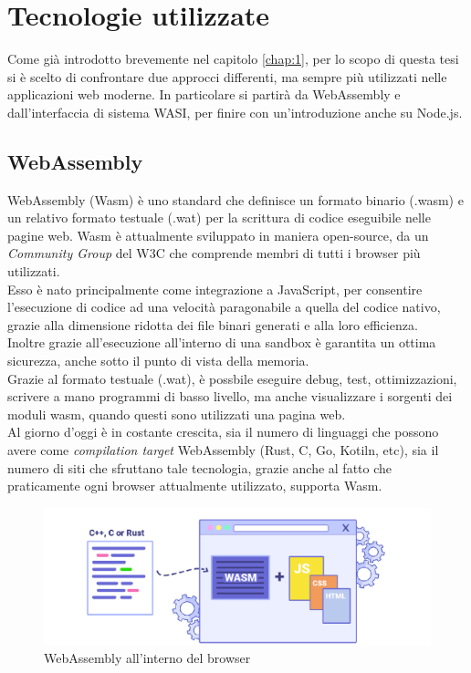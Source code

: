 \chapter{Tecnologie utilizzate}
\label{chap:2}
Come già introdotto brevemente nel capitolo \ref{chap:1}, per lo scopo di questa tesi si è scelto di confrontare due approcci differenti, ma sempre più utilizzati nelle applicazioni web moderne.
In particolare si partirà da WebAssembly e dall'interfaccia di sistema WASI, per finire con un'introduzione anche su Node.js.

\section{WebAssembly}
\label{sec:Wasm}
WebAssembly (Wasm) è uno standard che definisce un formato binario (.wasm) e un relativo formato testuale (.wat) per la scrittura di codice eseguibile nelle pagine web. 
Wasm è attualmente sviluppato in maniera open-source, da un \emph{Community Group} del W3C che comprende membri di tutti i browser più utilizzati.
\\Esso è nato principalmente come integrazione a JavaScript, per consentire l'esecuzione di codice ad una velocità paragonabile a quella del codice nativo, grazie alla dimensione ridotta dei file binari generati e alla loro efficienza.
\\Inoltre grazie all'esecuzione all'interno di una sandbox è garantita un ottima sicurezza, anche sotto il punto di vista della memoria.
\\Grazie al formato testuale (.wat), è possbile eseguire debug, test, ottimizzazioni, scrivere a mano programmi di basso livello, ma anche visualizzare i sorgenti dei moduli wasm, quando questi sono utilizzati una pagina web.
\cite*{wasmDesign}
\\Al giorno d'oggi è in costante crescita, sia il numero di linguaggi che possono avere come \emph{compilation target} WebAssembly (Rust, C, Go, Kotiln, etc), sia il numero di siti che sfruttano tale tecnologia, grazie anche al fatto che praticamente ogni browser attualmente utilizzato, supporta Wasm. 
\begin{figure}
        \begin{center}
                \includegraphics[width=0.8\columnwidth]{images/wasm.png}
        \end{center}
        \caption{WebAssembly all'interno del browser}
        \label{fig:wasm}
\end{figure}
